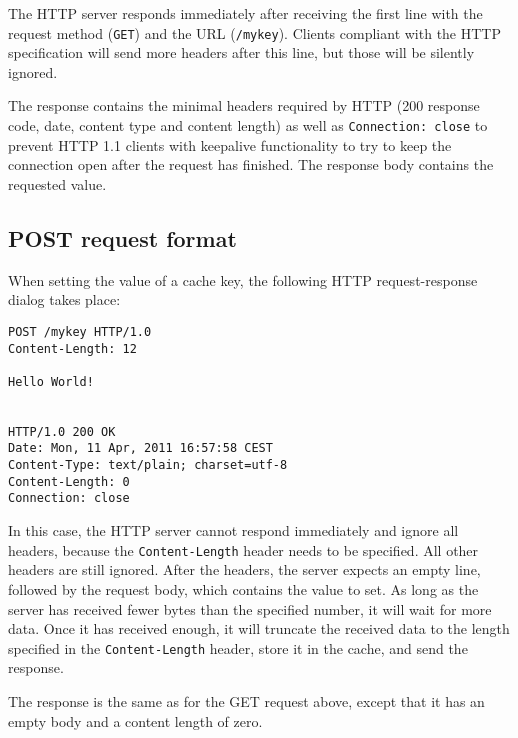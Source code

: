 \documentclass{article}
\begin{document}
The HTTP server responds immediately after receiving the first line with the
request method (\lstinline!GET!) and the URL (\lstinline!/mykey!). Clients
compliant with the HTTP specification will send more headers after this line,
but those will be silently ignored.

The response contains the minimal headers required by HTTP (200 response code,
date, content type and content length) as well as \lstinline!Connection: close!
to prevent HTTP 1.1 clients with keepalive functionality to try to keep the
connection open after the request has finished. The response body contains
the requested value.

\subsection*{POST request format}
When setting the value of a cache key, the following HTTP request-response
dialog takes place:

\begin{lstlisting}
POST /mykey HTTP/1.0
Content-Length: 12

Hello World!


HTTP/1.0 200 OK
Date: Mon, 11 Apr, 2011 16:57:58 CEST
Content-Type: text/plain; charset=utf-8
Content-Length: 0
Connection: close
\end{lstlisting}

In this case, the HTTP server cannot respond immediately and ignore all headers,
because the \lstinline!Content-Length! header needs to be specified. All other
headers are still ignored. After the headers, the server expects an empty line,
followed by the request body, which contains the value to set. As long as the
server has received fewer bytes than the specified number, it will wait for
more data. Once it has received enough, it will truncate the received data
to the length specified in the \lstinline!Content-Length! header, store it
in the cache, and send the response.

The response is the same as for the GET request above, except that it has an
empty body and a content length of zero.
\end{document}
